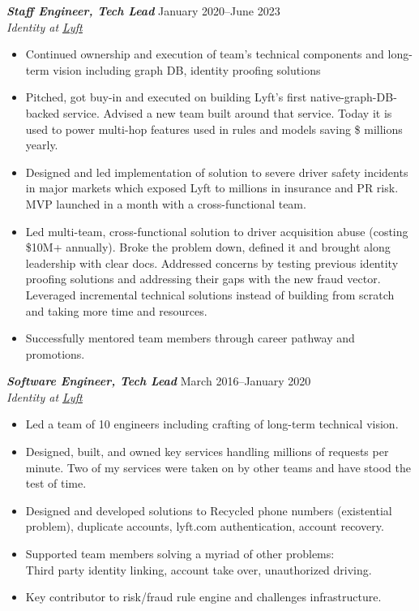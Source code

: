 \documentclass[line]{resume}
\begin{document}
\begin{resume}
    {\sl\textbf{Staff Engineer, Tech Lead}} \hfill January 2020--June 2023\\
    \emph{Identity at \underline{\href{https://www.lyft.com/}{Lyft}}}
    \begin{itemize}
        \item Continued ownership and execution of team's technical components and long-term
            vision including graph DB, identity proofing solutions
        \item Pitched, got buy-in and executed on building Lyft's first native-graph-DB-backed service. Advised a new team built around that service. Today it is used to power multi-hop features used in rules and models saving \$ millions yearly.
	\item Designed and led implementation of solution to severe driver safety incidents in major markets which exposed Lyft to millions in insurance and PR risk. MVP launched in a month with a cross-functional team.
	\item Led multi-team, cross-functional solution to driver acquisition abuse (costing \$10M+ annually). Broke the problem down, defined it and brought along leadership with clear docs. Addressed concerns by testing previous identity proofing solutions and addressing their gaps with the new fraud vector. Leveraged incremental technical solutions instead of building from scratch and taking more time and resources.
        \item Successfully mentored team members through career pathway and
            promotions.
    \end{itemize}
    \vspace{6pt}

    {\sl\textbf{Software Engineer, Tech Lead}} \hfill March 2016--January 2020\\
    \emph{Identity at \underline{\href{https://www.lyft.com/}{Lyft}}}
    \begin{itemize}
        \item Led a team of 10 engineers including crafting of long-term
            technical vision.
        \item Designed, built, and owned key services handling millions of
            requests per minute. Two of my services were taken on by other teams
            and have stood the test of time. 
        \item Designed and developed solutions to
	    Recycled phone numbers (existential problem), duplicate accounts, lyft.com authentication,
            account recovery.
        \item Supported team members solving a myriad of other problems: \\
            Third party identity linking, account take over, unauthorized
            driving.
        \item Key contributor to risk/fraud rule engine and challenges
            infrastructure.
    \end{itemize}
    \vspace{6pt}


\end{resume}
\end{document}
